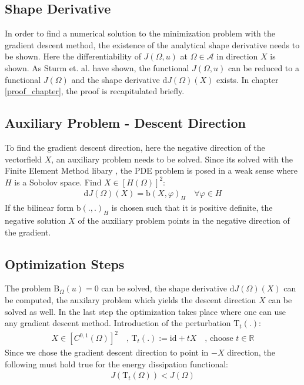 \subsection*{Shape Derivative}
In order to find a numerical solution to the minimization problem with the gradient descent
method, the existence of the analytical shape derivative needs to be shown. Here the
differentiability of $J(\Omega,u)$ at $\Omega \in \mathcal{A}$ in direction $X$ is shown. 
As Sturm et. al. \cite{nearly_conformal_paper} have shown, the functional 
$J(\Omega, u)$ can be reduced to a functional $J(\Omega)$ and the shape derivative 
$\mathrm{d}J(\Omega)(X)$ exists. In chapter \ref{proof_chapter}, the proof is recapitulated briefly.

\pagebreak

\subsection*{Auxiliary Problem - Descent Direction}
To find the gradient descent direction, here the negative direction of the vectorfield $X$, an auxiliary problem needs to be solved.
Since its solved with the Finite Element Method libary , the PDE problem is posed in a weak sense where 
$H$ is a Sobolov space. Find $X \in [H(\Omega)]^2:$ 
\begin{align*}
    \mathrm{d}J(\Omega)(X) = \mathrm{b}(X,\varphi)_H \quad \forall  \varphi \in H
\end{align*}
If the bilinear form $\mathrm{b}(.,.)_H$ is chosen such that it is positive definite, the negative solution $X$
of the auxiliary problem points in the negative direction of the gradient.

\subsection*{Optimization Steps}
The problem $\mathrm{B}_{\Omega}(u) = 0$ can be solved, the shape derivative $\mathrm{d}J(\Omega)(X)$ can be computed, the auxilary problem which yields 
the descent direction $X$ can be solved as well. In the last step the optimization takes place where one can use any gradient descent method. Introduction
of the perturbation $\mathrm{T}_t(.)$:
 \begin{align*}
    X \in [C^{0,1}(\Omega)]^2 \quad , \, \mathrm{T}_t(.):= \mathrm{id} + tX \quad , \, \text{choose } t \in \mathbb{R}
\end{align*}
Since we chose the gradient descent direction to point in $-X$ direction, the following must hold true for the energy dissipation functional:
\begin{align*}
    J(\mathrm{T}_t(\Omega)) <J(\Omega)
\end{align*}
